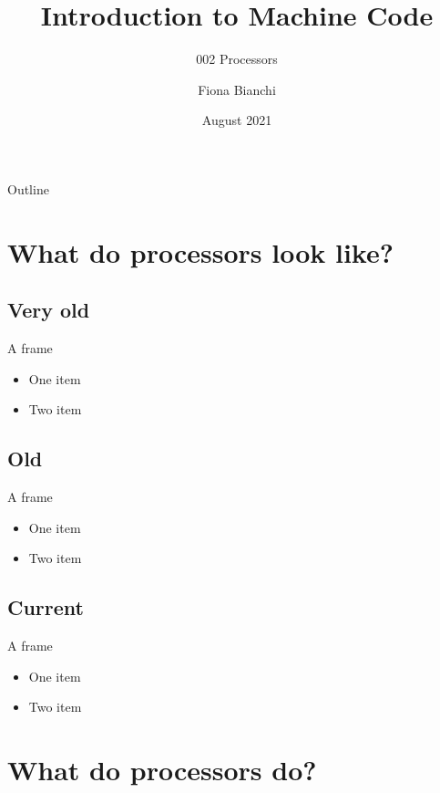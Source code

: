 \documentclass{beamer}
\title{Introduction to Machine Code}
\subtitle{002 Processors}
\author{Fiona Bianchi}
\institute{HiKlas Ltd}
\date{August 2021}
\begin{document}
\begin{frame}
  \titlepage
\end{frame}

\begin{frame}{Outline}
  \tableofcontents
\end{frame}

\section{What do processors look like?}

\subsection[Precursors]{Very old}

\begin{frame}{A frame}
  \begin{itemize}
  \item
    One item
  \item
    Two item
  \end{itemize}
\end{frame}


\subsection[Firsts]{Old}

\begin{frame}{A frame}
  \begin{itemize}
  \item
    One item
  \item
    Two item
  \end{itemize}
\end{frame}

\subsection[Modern]{Current}

\begin{frame}{A frame}
  \begin{itemize}
  \item
    One item
  \item
    Two item
  \end{itemize}
\end{frame}



\section{What do processors do?}
\end{document}
